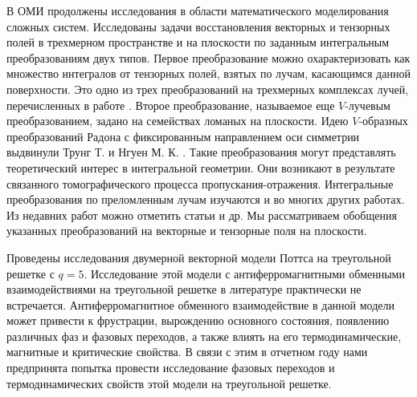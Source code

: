 В ОМИ продолжены исследования в области математического моделирования сложных систем. Исследованы задачи восстановления векторных и тензорных полей в трехмерном пространстве и на плоскости по заданным интегральным преобразованиям двух типов. Первое преобразование можно охарактеризовать как множество интегралов от тензорных полей, взятых по лучам, касающимся данной поверхности. Это одно из трех преобразований на трехмерных комплексах лучей, перечисленных в работе \cite{Medzhidov}.
Второе преобразование, называемое еще $V$-лучевым преобразованием, задано на семействах ломаных на плоскости. Идею $V$-образных преобразований Радона с фиксированным направлением оси симметрии выдвинули Трунг Т. и Нгуен М. К. \cite{Truong}. Такие преобразования могут представлять теоретический интерес в интегральной геометрии. Они возникают в результате связанного томографического процесса пропускания-отражения. Интегральные преобразования по преломленным лучам изучаются и во многих других работах. Из недавних работ можно отметить статьи \cite{Sharafutdinov,Ambartsoumian}  и др.
Мы рассматриваем обобщения указанных преобразований на векторные и тензорные поля на плоскости.

Проведены исследования двумерной векторной модели Поттса на треугольной решетке с $q = 5$. Исследование этой модели с антиферромагнитными обменными взаимодействиями на треугольной решетке в литературе практически не встречается. Антиферромагнитное обменного взаимодействие в данной модели может привести к фрустрации, вырождению основного состояния, появлению различных фаз и фазовых переходов, а также влиять на его термодинамические, магнитные и критические свойства. В связи с этим в отчетном году нами предпринята попытка провести исследование фазовых переходов и термодинамических свойств этой модели на треугольной решетке. 